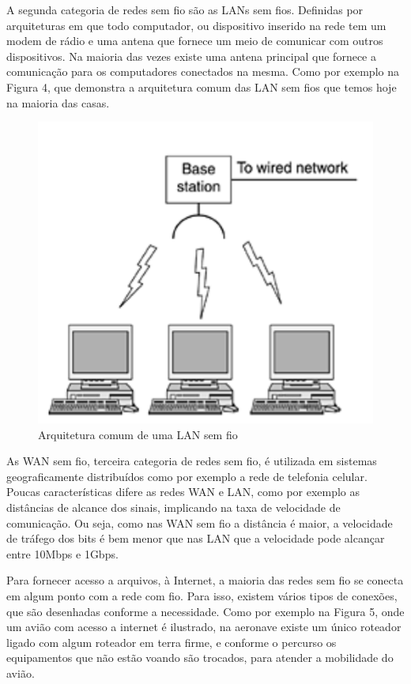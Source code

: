 \documentclass[12pt, %
openright, 
oneside,
a4paper,
brazil]{facom-ufu-abntex2}
\begin{document}
A segunda categoria de redes sem fio são as LANs sem fios. Definidas por arquiteturas em que todo computador, ou dispositivo inserido na rede tem um modem de rádio e uma antena que fornece um meio de comunicar com outros dispositivos. Na maioria das vezes existe uma antena principal que fornece a comunicação para os computadores conectados na mesma. Como por exemplo na Figura 4, que demonstra a arquitetura comum das \ac{LAN} sem fios que temos hoje na maioria das casas.

\begin{figure}[hbt]
  \includegraphics[scale=0.9]{lan} 
  \caption{Arquitetura comum de uma \ac{LAN} sem fio \cite{tanenbaum2003redes}}
\end{figure}

As \ac{WAN} sem fio, terceira categoria de redes sem fio, é utilizada em sistemas geograficamente distribuídos como por exemplo a rede de telefonia celular. Poucas características difere as redes \ac{WAN} e \ac{LAN}, como por exemplo as distâncias de alcance dos sinais, implicando na taxa de velocidade de comunicação. Ou seja, como nas \ac{WAN} sem fio a distância é maior, a velocidade de tráfego dos bits é bem menor que nas \ac{LAN} que a velocidade pode alcançar entre 10Mbps e 1Gbps.

Para fornecer acesso a arquivos, à Internet, a maioria das redes sem fio se conecta   em algum ponto com a rede com fio. Para isso, existem vários tipos de conexões, que são desenhadas conforme a necessidade. Como por exemplo na Figura 5, onde um avião com acesso a internet é ilustrado, na aeronave existe um único roteador ligado com algum roteador em terra firme, e conforme o percurso os equipamentos que não estão voando são trocados, para atender a mobilidade do avião.
\end{document}
